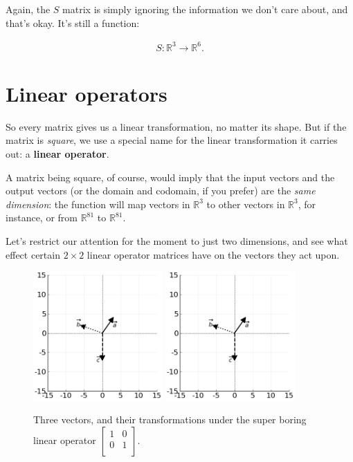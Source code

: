 Again, the $S$ matrix is simply ignoring the information we don't care about,
and that's okay. It's still a function:

\vspace{-.15in}
\begin{align*}
S : \mathbb{R}^3 \rightarrow \mathbb{R}^6.
\end{align*}
\vspace{-.15in}


\section{Linear operators}


So every matrix gives us a linear transformation, no matter its shape. But if
the matrix is \textit{square}, we use a special name for the linear
transformation it carries out: a \textbf{linear operator}.

A matrix being square, of course, would imply that the input vectors and the
output vectors (or the domain and codomain, if you prefer) are the \textit{same
dimension}: the function will map vectors in $\mathbb{R}^3$ to other vectors in
$\mathbb{R}^3$, for instance, or from $\mathbb{R}^{81}$ to $\mathbb{R}^{81}$.

Let's restrict our attention for the moment to just two dimensions, and see
what effect certain $2\times 2$ linear operator matrices have on the vectors
they act upon.

\begin{figure}[hb]
\centering
\includegraphics[width=0.44\textwidth]{preoperators.png}
\includegraphics[width=0.44\textwidth]{preoperators.png}
\caption[.]{Three vectors, and their transformations under the super boring
linear operator {\scriptsize $\begin{bmatrix} 1 & 0 \\ 0 & 1 \\
\end{bmatrix}$.}}
\label{fig:identityOp}
\end{figure}

